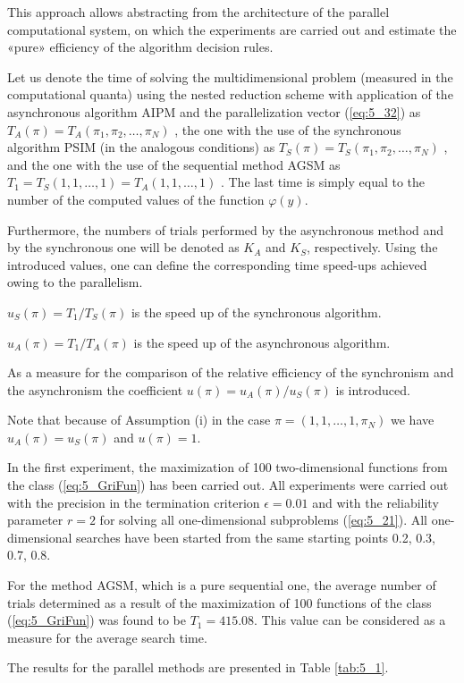 This approach allows abstracting from the architecture of the parallel computational system, on which the experiments are carried out and estimate the «pure» efficiency of the algorithm decision rules. 

Let us denote the time of solving the multidimensional problem (measured in the computational quanta) using the nested reduction scheme with application of the asynchronous algorithm AIPM and the parallelization vector (\ref{eq:5_32}) as $T_A(\pi)=T_A(\pi_1,\pi_2,\ldots,\pi_N)$ , the one with the use of the synchronous algorithm PSIM  (in the analogous conditions) as $T_S(\pi)=T_S(\pi_1,\pi_2,\ldots,\pi_N)$ , and the one with the use of the sequential method AGSM as $T_1=T_S(1,1,\ldots,1)=T_A(1,1,\ldots,1)$ . The last time is simply equal to the number of the computed values of the function $\varphi(y)$.

Furthermore, the numbers of trials performed by the asynchronous method and by the synchronous one will be denoted as $K_A$  and $K_S$, respectively. Using the introduced values, one can define the corresponding time speed-ups achieved owing to the parallelism.

$u_S(\pi)=T_1/T_S(\pi)$ is the speed up of the synchronous algorithm.

$u_A(\pi)=T_1/T_A(\pi)$ is the speed up of the asynchronous algorithm.

As a measure for the comparison of the relative efficiency of the synchronism and the asynchronism the coefficient $u(\pi)=u_A(\pi)/u_S(\pi)$ is introduced.

Note that because of Assumption (i) in the case $\pi=(1,1,\ldots,1,\pi_N)$  we have $u_A(\pi)=u_S(\pi)$ and $u(\pi)=1$.

In the first experiment, the maximization of 100 two-dimensional functions from the class (\ref{eq:5_GriFun}) has been carried out. All experiments were carried out with the precision in the termination criterion $\epsilon=0.01$  and with the reliability parameter $r=2$  for solving all one-dimensional subproblems (\ref{eq:5_21}). All one-dimensional searches have been started from the same starting points {0.2, 0.3, 0.7, 0.8}.

For the method AGSM, which is a pure sequential one, the average number of trials determined as a result of the maximization of 100 functions of the class (\ref{eq:5_GriFun}) was found to be  $T_1= 415.08$. This value can be considered as a measure for the average search time. 

The results for the parallel methods are presented in Table \ref{tab:5_1}.


